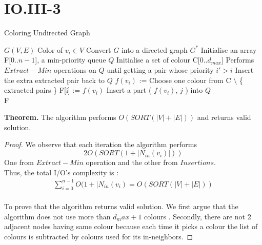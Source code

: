 \section*{IO.III-3}

\begin{algorithm}
  \caption{Coloring Undirected Graph}
  \label{alg:global_minimum}
  \begin{algorithmic}
    \renewcommand{\algorithmicrequire}{\textbf{Input:}}
    \renewcommand{\algorithmicensure}{\textbf{Output:}}
    \algnewcommand{}
    \algnewcommand\Operation{\item[\algorithmicoperation]}
    \Require $G( V, E )$
    \Ensure Color of $v_i \in V$
    \Operation
    \State Convert $G$ into a directed graph $G^*$
    \State Initialise an array F[0..$n-1$], a min-priority queue $Q$
    \State Initialise a set of colour C[0..$d_{max}$]
    	\State Performs $Extract-Min$ operations on $Q$ until getting a pair whose priority $i' > i$
	\State Insert the extra extracted pair back to $Q$
	\State $f(v_i)$ := Choose one colour from C $\setminus$ \{ extracted pairs \}
	\State F[i] := $f(v_i)$
	        \State Insert a part ( $f(v_i)$, $j$ ) into $Q$
	   \EndFor
    \EndFor \\
    \Return F
  \end{algorithmic}
\end{algorithm}
\textbf{Theorem.} The algorithm performs $O( SORT(|V|+|E|) )$ and returns valid solution.

\begin{proof}
We observe that each iteration the algorithm performs $$2O( SORT(1 + |N_{in}(v_i)| ))$$
One from $Extract-Min$ operation and the other from $Insertions$. \\
Thus, the total I/O's complexity  is :
\begin{align*}
 \sum^{n-1}_{i=0}{O( 1 + |N_{in}(v_i)} = O( SORT( |V|+|E| ))
\end{align*}
\\
To prove that the algorithm returns valid solution. We first argue that the algorithm does not use more than $d_max + 1 $ colours . Secondly, there are not 2 adjacent nodes having same colour because each time it picks a colour the list of colours is subtracted by colours used for its in-neighbors.
	
\end{proof}
